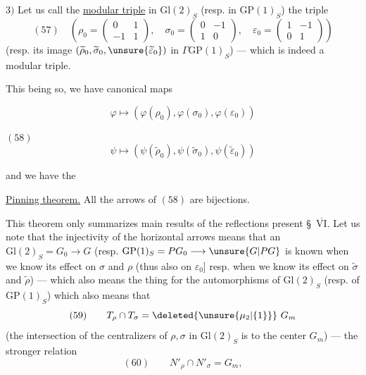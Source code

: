  $3)$ Let us call the \uline{}
\uline{modular triple} in $\mathrm{Gl}(2)_S$
(resp. in $\mathrm{GP}(1)_S$) the triple
\[
(57)\quad\left(\rho_0=\begin{pmatrix}0&1\\-1&1\end{pmatrix},\quad
\sigma_0=\begin{pmatrix}0&-1\\1&0\end{pmatrix},\quad
\varepsilon_0=\begin{pmatrix}1&-1\\0&1\end{pmatrix}\right)
\]
(resp. its image $(\widetilde\rho_0,\widetilde\sigma_0,
\unsure{\widetilde\varepsilon_0})$ in $\Gamma\mathrm{GP}(1)_S$) ---
which is indeed a modular triple.

This being so, we have  canonical
maps


\[
\varphi\longmapsto(\varphi(\rho_0),\varphi(\sigma_0),\varphi(\varepsilon_0))
\]

$(58)$
\[
\psi\longmapsto(\psi(\widetilde\rho_0),\psi(\widetilde\sigma_0),
\psi(\widetilde\varepsilon_0))
\]

and we have the

\uline{Pinning theorem.} All the arrows of $(58)$ are bijections.

This theorem only summarizes 
 main results of the reflections
 present \S\ \uline{$\overline{\mathrm{VI}}$}.
Let us note that the injectivity of the horizontal arrows means 
that an 
$\mathrm{Gl}(2)_S=G_0\longrightarrow G$
(resp. $\mathrm{GP}(1)_S=PG_0\longrightarrow\unsure{G|PG}$
is known when we know its effect on $\sigma$ and $\rho$
(thus also on $\varepsilon_0$]
\unsure{$\leftarrow$} resp. when we know its effect on
$\widetilde\sigma$ and $\widetilde\rho$) --- which also means
the  thing for the automorphisms of
$\mathrm{Gl}(2)_S$ (resp. of $\mathrm{GP}(1)_S$)
which also means that
\[
(59)\qquad T_\rho\cap T_\sigma=\deleted{\unsure{\mu_2|\{1\}}}\ G_m
\]
(the intersection of the centralizers of $\rho,\sigma$ in
$\mathrm{Gl}(2)_S$ is  to the center $G_m$) ---
 the stronger relation
\[
(60)\qquad N'_\rho\cap N'_\sigma=G_m,
\]

